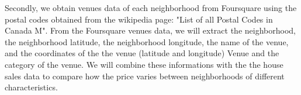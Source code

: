 \documentclass{article}
\begin{document}
Secondly, we obtain venues data of each neighborhood from Foursquare using the postal codes obtained from the wikipedia page: "List of all Postal Codes in Canada M". From the Foursquare venues data, we will extract the neighborhood, the neighborhood latitude, the neighborhood longitude, the name of the venue, and the coordinates of the the venue (latitude and longitude)	Venue and the category of the venue. We will combine these informations with the the house sales data to compare how the price varies between neighborhoods of different characteristics. 





\end{document}
